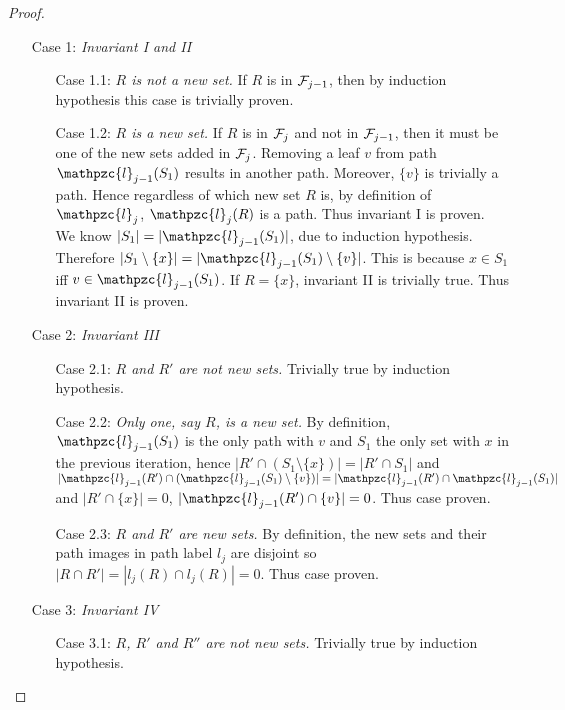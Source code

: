 \documentclass{fsttcs}
\def\cF{{\cal F}}
\def\cl{\mathpzc{l}}
\begin{document}
\begin{proof}
  \noindent
  \begin{enumerate}
  \item [Case 1:] {\em Invariant I and II} 
    \begin{enumerate}
    \item [Case 1.1:] {\em $R$ is not a new set.} If $R$ is in
      $\cF_{j-1}$, then by induction hypothesis this case is trivially
      proven.
    \item [Case 1.2:] {\em $R$ is a new set.} If $R$ is in $\cF_{j}$
      and not in $\cF_{j-1}$, then it must be one of the new sets
      added in $\cF_j$. Removing a leaf $v$ from path $\cl_{j-1}(S_1)$
      results in another path. Moreover, $\{v\}$ is trivially a
      path. Hence regardless of which new set $R$ is, by definition of
      $\cl_j$, $\cl_{j}(R)$ is a path. Thus invariant I is proven.\\
      We know $|S_1| = |\cl_{j-1}(S_1)|$, due to induction
      hypothesis. Therefore $|S_1 \setminus \{x\}| = |\cl_{j-1}(S_1)
      \setminus \{v\}|$. This is because $x \in S_1$ iff $v \in
      \cl_{j-1}(S_1)$. If $R = \{x\}$, invariant II is trivially
      true. Thus invariant II is proven.
  \end{enumerate}
  \item [Case 2:] {\em Invariant III}
    \begin{enumerate}
    \item [Case 2.1:] {\em $R$ and $R'$ are not new sets.} Trivially
      true by induction hypothesis.
    \item [Case 2.2:] {\em Only one, say $R$, is a new set.} 
  By definition, $\cl_{j-1}(S_1)$ is the only path with $v$ and $S_1$ the
  only set with $x$ in the
  previous iteration, hence $|R' \cap (S_1 \setminus \{x\})| = |R' \cap S_1|$
  and $|\cl_{j-1}(R') \cap (\cl_{j-1}(S_1) \setminus \{v\})| = |\cl_{j-1}(R') \cap \cl_{j-1}(S_1)|$ and $|R' \cap
  \{x\}| = 0$, $|\cl_{j-1}(R') \cap \{v\}| = 0$. Thus case proven.
    \item [Case 2.3:] {\em $R$ and $R'$ are new sets.} By definition,
      the new sets and their path images in path label $l_j$ are
      disjoint so $|R \cap R'| = |l_j(R) \cap l_j(R)| = 0$. Thus case
      proven.
    \end{enumerate}
  \item [Case 3:] {\em Invariant IV}
    \begin{enumerate}
    \item [Case 3.1:] {\em $R$, $R'$ and $R''$ are not new sets.} Trivially
      true by induction hypothesis.

\end{enumerate}
\end{enumerate}
\end{proof}
\end{document}
